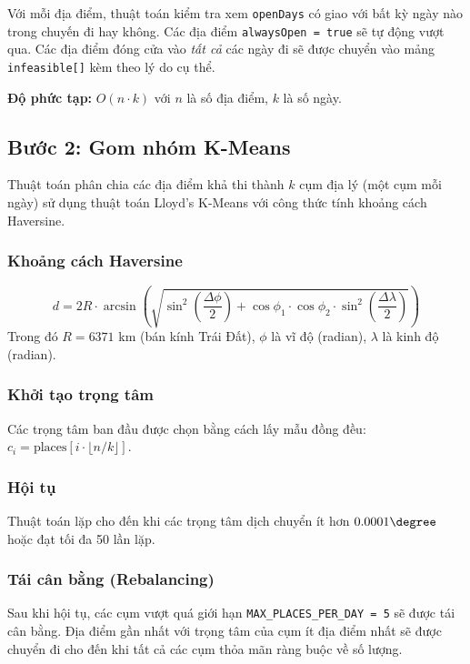 \documentclass[12pt,a4paper]{report}
\begin{document}
Với mỗi địa điểm, thuật toán kiểm tra xem \texttt{openDays} có giao với bất kỳ ngày nào trong chuyến đi hay không. Các địa điểm \texttt{alwaysOpen = true} sẽ tự động vượt qua. Các địa điểm đóng cửa vào \emph{tất cả} các ngày đi sẽ được chuyển vào mảng \texttt{infeasible[]} kèm theo lý do cụ thể.

\textbf{Độ phức tạp:} $O(n \cdot k)$ với $n$ là số địa điểm, $k$ là số ngày.

\subsection{Bước 2: Gom nhóm K-Means}

Thuật toán phân chia các địa điểm khả thi thành $k$ cụm địa lý (một cụm mỗi ngày) sử dụng thuật toán Lloyd's K-Means với công thức tính khoảng cách Haversine.

\subsubsection{Khoảng cách Haversine}
\begin{equation}
d = 2R \cdot \arcsin\left(\sqrt{\sin^2\!\left(\frac{\Delta\phi}{2}\right) + \cos\phi_1 \cdot \cos\phi_2 \cdot \sin^2\!\left(\frac{\Delta\lambda}{2}\right)}\right)
\end{equation}
Trong đó $R = 6371$ km (bán kính Trái Đất), $\phi$ là vĩ độ (radian), $\lambda$ là kinh độ (radian).

\subsubsection{Khởi tạo trọng tâm}
Các trọng tâm ban đầu được chọn bằng cách lấy mẫu đồng đều: $c_i = \text{places}[i \cdot \lfloor n/k \rfloor]$.

\subsubsection{Hội tụ}
Thuật toán lặp cho đến khi các trọng tâm dịch chuyển ít hơn $0.0001\degree$ hoặc đạt tối đa 50 lần lặp.

\subsubsection{Tái cân bằng (Rebalancing)}
Sau khi hội tụ, các cụm vượt quá giới hạn \texttt{MAX\_PLACES\_PER\_DAY = 5} sẽ được tái cân bằng. Địa điểm gần nhất với trọng tâm của cụm ít địa điểm nhất sẽ được chuyển đi cho đến khi tất cả các cụm thỏa mãn ràng buộc về số lượng.
\end{document}
